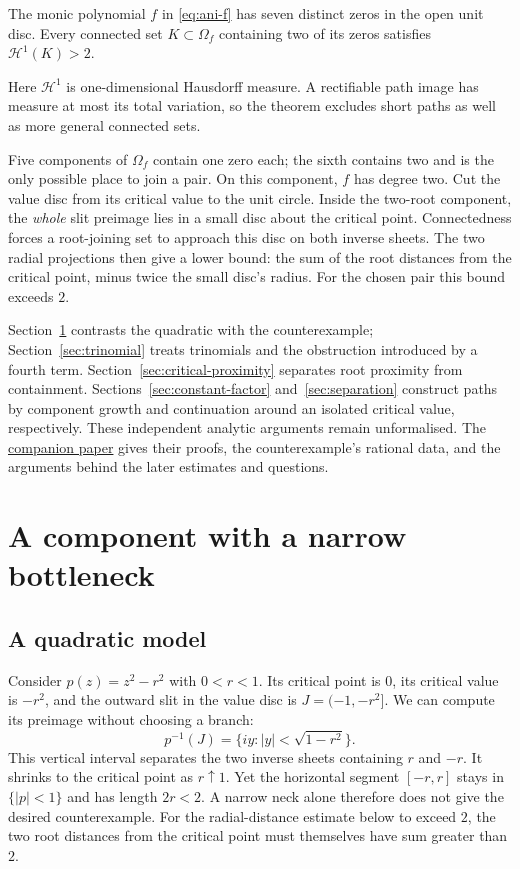 \documentclass[11pt]{article}
\begin{document}
\begin{theorem}\label{res:ani-degree-seven-counterexample}
The monic polynomial $f$ in \eqref{eq:ani-f} has seven distinct zeros in
the open unit disc. Every connected set $K\subset\Omega_f$ containing
two of its zeros satisfies $\mathcal H^1(K)>2$.
\end{theorem}

Here $\mathcal H^1$ is one-dimensional Hausdorff measure. A rectifiable
path image has measure at most its total variation, so the theorem
excludes short paths as well as more general connected sets.

Five components of $\Omega_f$ contain one zero each; the sixth contains
two and is the only possible place to join a pair. On this component,
$f$ has degree two. Cut the value disc from its critical value to the
unit circle. Inside the two-root component, the \emph{whole} slit
preimage lies in a small disc about the critical point. Connectedness
forces a root-joining set to approach this disc on both inverse sheets.
The two radial projections then give a lower bound: the sum of the root
distances from the critical point, minus twice the small disc's radius.
For the chosen pair this bound exceeds $2$.

Section~\ref{sec:counterexample} contrasts the quadratic with the
counterexample; Section~\ref{sec:trinomial} treats trinomials and the
obstruction introduced by a fourth term. Section~\ref{sec:critical-proximity}
separates root proximity from containment. Sections~\ref{sec:constant-factor}
and~\ref{sec:separation} construct paths by component growth and continuation
around an isolated critical value, respectively. These independent
analytic arguments remain unformalised. The
\href{erdos1041-lemniscate-reasoning-surface.pdf}{companion paper}
gives their proofs, the counterexample's rational data, and the arguments
behind the later estimates and questions.

\section{A component with a narrow bottleneck}\label{sec:counterexample}

\subsection{A quadratic model}
Consider $p(z)=z^2-r^2$ with $0<r<1$. Its critical point is $0$,
its critical value is $-r^2$, and the outward slit in the value disc is
$J=(-1,-r^2]$. We can compute its preimage without choosing a branch:
\[
 p^{-1}(J)=\{iy:|y|<\sqrt{1-r^2}\}.
\]
This vertical interval separates the two inverse sheets containing $r$
and $-r$. It shrinks to the critical point as $r\uparrow1$. Yet the
horizontal segment $[-r,r]$ stays in $\{|p|<1\}$ and has length $2r<2$.
A narrow neck alone therefore does not give the desired counterexample.
For the radial-distance estimate below to exceed $2$, the two root
distances from the critical point must themselves have sum greater than $2$.
\end{document}
